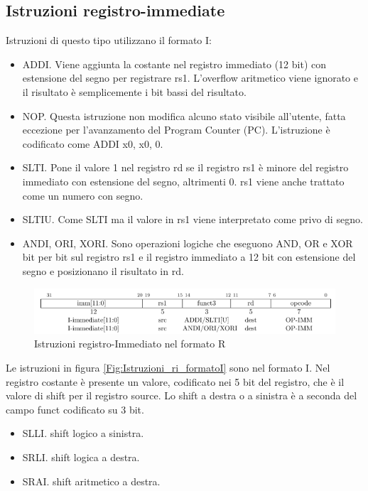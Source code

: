 \documentclass[12pt,a4paper]{report}
\begin{document}
\subsection{Istruzioni registro-immediate}
Istruzioni di questo tipo utilizzano il formato I:
\begin{itemize}
	\item ADDI.  Viene aggiunta la costante nel registro immediato (12 bit) con estensione del segno per registrare rs1. L'overflow aritmetico viene ignorato e il risultato è semplicemente i bit bassi del risultato.
 \item NOP. Questa istruzione non modifica alcuno stato visibile all'utente, fatta eccezione per l'avanzamento del Program Counter (PC). L'istruzione è codificato come ADDI x0, x0, 0.
 \item SLTI.  Pone il valore 1 nel registro rd se il registro rs1 è minore del registro immediato con estensione del segno, altrimenti 0. rs1 viene anche trattato come un numero con segno.
\item SLTIU.  Come SLTI ma il valore in rs1 viene interpretato come privo di segno.
\item ANDI, ORI, XORI. Sono operazioni logiche che eseguono AND, OR e XOR bit per bit sul registro rs1 e il registro immediato a 12 bit con estensione del segno e posizionano il risultato in rd.
\end{itemize}

\begin{figure}
	\includegraphics[width = \textwidth]{Istruzioni/Istruction1.png}
	\caption{Istruzioni registro-Immediato nel formato R}
	\label{Fig:Istruzioni_ri_formatoR}
\end{figure}


Le istruzioni in figura \ref{Fig:Istruzioni_ri_formatoI} sono nel formato I. Nel registro costante è presente un valore, codificato nei 5 bit del registro,  che è il valore di shift per il registro source. Lo shift a destra o a sinistra è a seconda del campo funct codificato su 3 bit.

\begin{itemize}
	\item  SLLI. shift logico a sinistra.
	\item SRLI. shift logica a destra.
	\item SRAI. shift aritmetico a destra.
\end{itemize}
\end{document}
